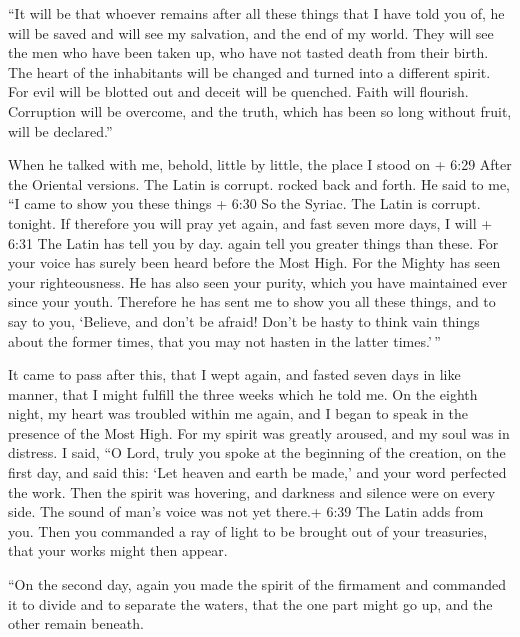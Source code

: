  ``It will be that whoever remains after all these things
that I have told you of, he will be saved and will see my salvation, and
the end of my world.  They will see the men who have been
taken up, who have not tasted death from their birth. The heart of the
inhabitants will be changed and turned into a different spirit.
 For evil will be blotted out and deceit will be quenched.
 Faith will flourish. Corruption will be overcome, and the
truth, which has been so long without fruit, will be declared.''

 When he talked with me, behold, little by little, the
place I stood on + 6:29 After the Oriental versions. The Latin is
corrupt. rocked back and forth.  He said to me, ``I came to
show you these things + 6:30 So the Syriac. The Latin is corrupt.
tonight.  If therefore you will pray yet again, and fast
seven more days, I will + 6:31 The Latin has tell you by day. again tell
you greater things than these.  For your voice has surely
been heard before the Most High. For the Mighty has seen your
righteousness. He has also seen your purity, which you have maintained
ever since your youth.  Therefore he has sent me to show
you all these things, and to say to you, `Believe, and don't be afraid!
 Don't be hasty to think vain things about the former
times, that you may not hasten in the latter times.'\,''

 It came to pass after this, that I wept again, and fasted
seven days in like manner, that I might fulfill the three weeks which he
told me.  On the eighth night, my heart was troubled within
me again, and I began to speak in the presence of the Most High.
 For my spirit was greatly aroused, and my soul was in
distress.  I said, ``O Lord, truly you spoke at the
beginning of the creation, on the first day, and said this: `Let heaven
and earth be made,' and your word perfected the work.  Then
the spirit was hovering, and darkness and silence were on every side.
The sound of man's voice was not yet there.+ 6:39 The Latin adds from
you.  Then you commanded a ray of light to be brought out
of your treasuries, that your works might then appear.

 ``On the second day, again you made the spirit of the
firmament and commanded it to divide and to separate the waters, that
the one part might go up, and the other remain beneath.

